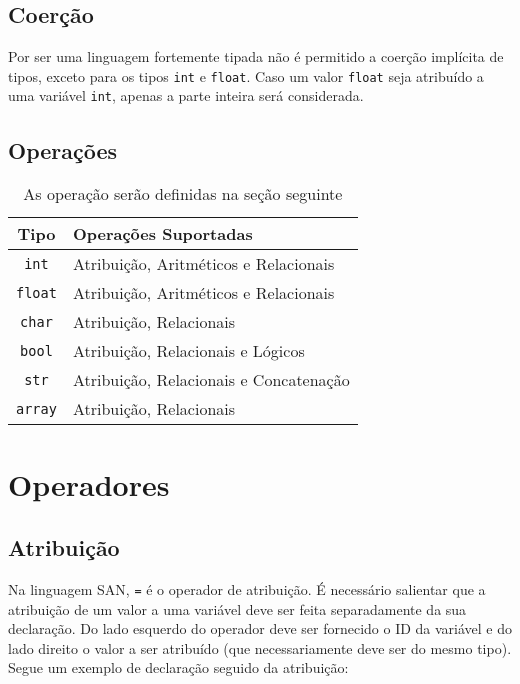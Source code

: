 \documentclass[a4paper,11pt]{article}
\begin{document}
\clearpage

\subsection{Coerção}
Por ser uma linguagem fortemente tipada não é permitido a coerção implícita de tipos, exceto para
os tipos \texttt{int} e \texttt{float}. Caso um valor \texttt{float} seja atribuído a uma variável
\texttt{int}, apenas a parte inteira será considerada.

\subsection{Operações}
\begin{table}[h!]
    \centering
    \begin{tabular}{|c|l|}
         \hline
         \textbf{Tipo} & \textbf{Operações Suportadas}\\
         \hline
         \texttt{int} & Atribuição, Aritméticos e Relacionais\\
         \hline
         \texttt{float} & Atribuição, Aritméticos e Relacionais\\
         \hline
         \texttt{char} & Atribuição, Relacionais\\
         \hline
         \texttt{bool} & Atribuição, Relacionais e Lógicos\\
         \hline
         \texttt{str} & Atribuição, Relacionais e Concatenação\\
         \hline
         \texttt{array} & Atribuição, Relacionais\\
         \hline
    \end{tabular}
    \caption{As operação serão definidas na seção seguinte}
\end{table}

\section{Operadores}
\subsection{Atribuição}
Na linguagem SAN, \texttt{=} é o operador de atribuição. É necessário salientar que a atribuição
de um valor a uma variável deve ser feita separadamente da sua declaração. Do lado esquerdo do
operador deve ser fornecido o ID da variável e do lado direito o valor a ser atribuído (que
necessariamente deve ser do mesmo tipo). Segue um exemplo de declaração seguido da atribuição:
\end{document}
